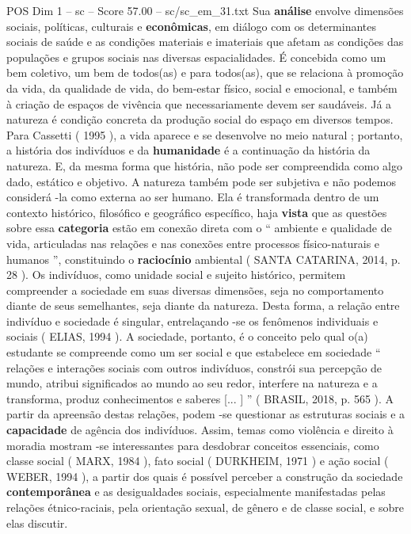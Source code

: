 \begin{textsample}{POS Dim 1 – sc – Score 57.00 – sc/sc\_em\_31.txt}
Sua \textbf{análise} envolve dimensões sociais, políticas, culturais e \textbf{econômicas}, em diálogo com os determinantes sociais de saúde e as condições materiais e imateriais que afetam as condições das populações e grupos sociais nas diversas espacialidades.
É concebida como um bem coletivo, um bem de todos(as) e para todos(as), que se relaciona à promoção da vida, da qualidade de vida, do bem-estar físico, social e emocional, e também à criação de espaços de vivência que necessariamente devem ser saudáveis.
Já a natureza é condição concreta da produção social do espaço em diversos tempos.
Para Cassetti ( 1995 ), a vida aparece e se desenvolve no meio natural ; portanto, a história dos indivíduos e da \textbf{humanidade} é a continuação da história da natureza.
E, da mesma forma que história, não pode ser compreendida como algo dado, estático e objetivo.
A natureza também pode ser subjetiva e não podemos considerá -la como externa ao ser humano.
Ela é transformada dentro de um contexto histórico, filosófico e geográfico específico, haja \textbf{vista} que as questões sobre essa \textbf{categoria} estão em conexão direta com o “ ambiente e qualidade de vida, articuladas nas relações e nas conexões entre processos físico-naturais e humanos ”, constituindo o \textbf{raciocínio} ambiental ( SANTA CATARINA, 2014, p. 28 ).
Os indivíduos, como unidade social e sujeito histórico, permitem compreender a sociedade em suas diversas dimensões, seja no comportamento diante de seus semelhantes, seja diante da natureza.
Desta forma, a relação entre indivíduo e sociedade é singular, entrelaçando -se os fenômenos individuais e sociais ( ELIAS, 1994 ).
A sociedade, portanto, é o conceito pelo qual o(a) estudante se compreende como um ser social e que estabelece em sociedade “ relações e interações sociais com outros indivíduos, constrói sua percepção de mundo, atribui significados ao mundo ao seu redor, interfere na natureza e a transforma, produz conhecimentos e saberes [... ] ” ( BRASIL, 2018, p. 565 ).
A partir da apreensão destas relações, podem -se questionar as estruturas sociais e a \textbf{capacidade} de agência dos indivíduos.
Assim, temas como violência e direito à moradia mostram -se interessantes para desdobrar conceitos essenciais, como classe social ( MARX, 1984 ), fato social ( DURKHEIM, 1971 ) e ação social ( WEBER, 1994 ), a partir dos quais é possível perceber a construção da sociedade \textbf{contemporânea} e as desigualdades sociais, especialmente manifestadas pelas relações étnico-raciais, pela orientação sexual, de gênero e de classe social, e sobre elas discutir.

\end{textsample}
